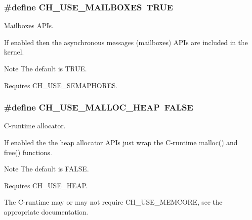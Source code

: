 \subsubsection[{C\+H\+\_\+\+U\+S\+E\+\_\+\+M\+A\+I\+L\+B\+O\+X\+E\+S}]{\setlength{\rightskip}{0pt plus 5cm}\#define C\+H\+\_\+\+U\+S\+E\+\_\+\+M\+A\+I\+L\+B\+O\+X\+E\+S~T\+R\+U\+E}\label{group__config_ga6cf1736db681617019f96c4c209d2716}


Mailboxes A\+P\+Is. 

If enabled then the asynchronous messages (mailboxes) A\+P\+Is are included in the kernel.

\begin{DoxyNote}{Note}
The default is {\ttfamily T\+R\+U\+E}. 

Requires {\ttfamily C\+H\+\_\+\+U\+S\+E\+\_\+\+S\+E\+M\+A\+P\+H\+O\+R\+E\+S}. 
\end{DoxyNote}
\hypertarget{group__config_ga4785d390f3a787916c5a5c41e953577d}{}
\subsubsection[{C\+H\+\_\+\+U\+S\+E\+\_\+\+M\+A\+L\+L\+O\+C\+\_\+\+H\+E\+A\+P}]{\setlength{\rightskip}{0pt plus 5cm}\#define C\+H\+\_\+\+U\+S\+E\+\_\+\+M\+A\+L\+L\+O\+C\+\_\+\+H\+E\+A\+P~F\+A\+L\+S\+E}\label{group__config_ga4785d390f3a787916c5a5c41e953577d}


C-\/runtime allocator. 

If enabled the the heap allocator A\+P\+Is just wrap the C-\/runtime {\ttfamily malloc()} and {\ttfamily free()} functions.

\begin{DoxyNote}{Note}
The default is {\ttfamily F\+A\+L\+S\+E}. 

Requires {\ttfamily C\+H\+\_\+\+U\+S\+E\+\_\+\+H\+E\+A\+P}. 

The C-\/runtime may or may not require {\ttfamily C\+H\+\_\+\+U\+S\+E\+\_\+\+M\+E\+M\+C\+O\+R\+E}, see the appropriate documentation. 
\end{DoxyNote}
\hypertarget{group__config_gaff85f4d919dac30a337ce2f34e2fa1af}{}
